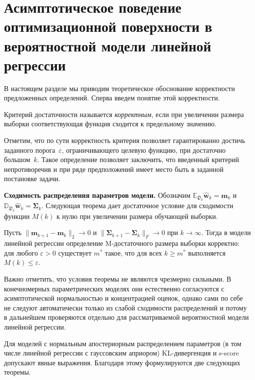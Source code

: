 \section{Асимптотическое поведение оптимизационной поверхности в вероятностной модели линейной регрессии}\label{sec:linear-theory}

В настоящем разделе мы приводим теоретическое обоснование корректности предложенных определений. Сперва введем понятие этой корректности.

\begin{definition}
    Критерий достаточности называется \emph{корректным}, если при увеличении размера выборки соответствующая функция сходится к предельному значению.
\end{definition}

Отметим, что по сути корректность критерия позволяет гарантированно достичь заданного порога~$\varepsilon$, ограничивающего целевую функцию, при достаточно большом~$k$. Такое определение позволяет заключить, что введенный критерий непротиворечив и при ряде предположений имеет место быть в заданной постановке задачи.

\textbf{Сходимость распределения параметров модели.} Обозначим $\mathbb{E}_{\mathfrak{D}_k} \hat{\mathbf{w}}_k = \mathbf{m}_k$ и $\mathbb{D}_{\mathfrak{D}_k} \hat{\mathbf{w}}_k = \boldsymbol{\Sigma}_k$. Следующая теорема дает достаточное условие для сходимости функции $M(k)$ к нулю при увеличении размера обучающей выборки.

\begin{theorem}\label{th:M-sufficient}
    Пусть $\|\mathbf{m}_{k+1} - \mathbf{m}_k\|_2 \to 0$ и $\|\boldsymbol{\Sigma}_{k+1} - \boldsymbol{\Sigma}_k\|_F \to 0$ при $k \to \infty$. Тогда в модели линейной регрессии определение M-достаточного размера выборки корректно: для любого $\varepsilon > 0$ существует $m^*$ такое, что для всех $k \geqslant m^*$ выполняется $M(k) \leqslant \varepsilon$.
\end{theorem}

Важно отметить, что условия теоремы не являются чрезмерно сильными. В конечномерных параметрических моделях они естественно согласуются с асимптотической нормальностью и концентрацией оценок, однако сами по себе не следуют автоматически только из слабой сходимости распределений и потому в дальнейшем проверяются отдельно для рассматриваемой вероятностной модели линейной регрессии.

Для моделей с нормальным апостериорным распределением параметров (в том числе линейной регрессии с гауссовским априором) KL-дивергенция и s-score допускают явные выражения. Благодаря этому формулируются две следующих теоремы.

